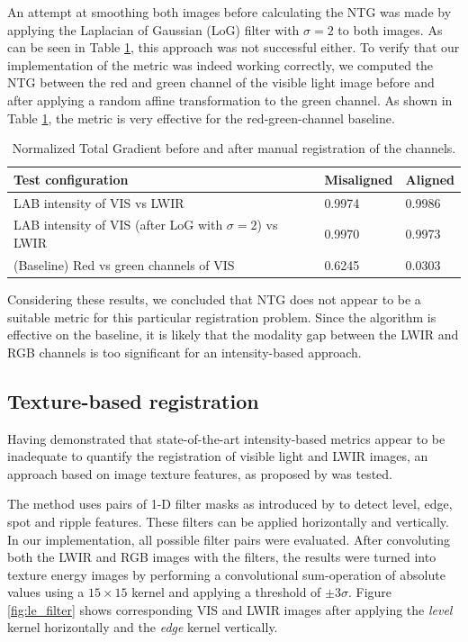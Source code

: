 \documentclass{l4proj}
\begin{document}
An attempt at smoothing both images before calculating the NTG was made by applying the Laplacian of Gaussian (LoG) filter with $\sigma=2$ to both images. As can be seen in Table \ref{table:registration_ntg}, this approach was not successful either. To verify that our implementation of the metric was indeed working correctly, we computed the NTG between the red and green channel of the visible light image before and after applying a random affine transformation to the green channel. As shown in Table \ref{table:registration_ntg}, the metric is very effective for the red-green-channel baseline. 

\begin{table}[ht]
  \centering
  \begin{tabular}{@{}lll@{}}
    \toprule
    \textbf{Test configuration}                               & \textbf{Misaligned} & \textbf{Aligned} \\ \midrule
    LAB intensity of VIS vs LWIR                              & 0.9974              & 0.9986           \\
    LAB intensity of VIS (after LoG with $\sigma=2$) vs LWIR  & 0.9970              & 0.9973           \\
    (Baseline) Red vs green channels of VIS                   & 0.6245              & 0.0303           \\ \bottomrule
  \end{tabular}
  \caption{Normalized Total Gradient before and after manual registration of the channels.}
  \label{table:registration_ntg}
\end{table}

Considering these results, we concluded that NTG does not appear to be a suitable metric for this particular registration problem. Since the algorithm is effective on the baseline, it is likely that the modality gap between the LWIR and RGB channels is too significant for an intensity-based approach.

\subsection{Texture-based registration}

Having demonstrated that state-of-the-art intensity-based metrics appear to be inadequate to quantify the registration of visible light and LWIR images, an approach based on image texture features, as proposed by \citet{jarc_graz_2007} was tested. 

The method uses pairs of 1-D filter masks as introduced by \citet{laws_rapid_1980} to detect level, edge, spot and ripple features. These filters can be applied horizontally and vertically. In our implementation, all possible filter pairs were evaluated. After convoluting both the LWIR and RGB images with the filters, the results were turned into texture energy images by performing a convolutional sum-operation of absolute values using a $15 \times 15$ kernel and applying a threshold of $\pm 3 \sigma$. Figure \ref{fig:le_filter} shows corresponding VIS and LWIR images after applying the \textit{level} kernel horizontally and the \textit{edge} kernel vertically.
\end{document}
